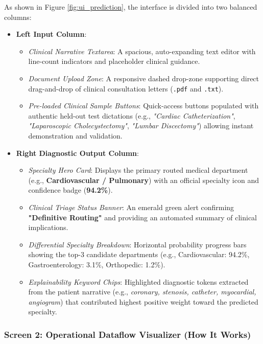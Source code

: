 As shown in Figure \ref{fig:ui_prediction}, the interface is divided into two balanced columns:
\begin{itemize}
    \item \textbf{Left Input Column}:
    \begin{itemize}
        \item \textit{Clinical Narrative Textarea}: A spacious, auto-expanding text editor with line-count indicators and placeholder clinical guidance.
        \item \textit{Document Upload Zone}: A responsive dashed drop-zone supporting direct drag-and-drop of clinical consultation letters (\texttt{.pdf} and \texttt{.txt}).
        \item \textit{Pre-loaded Clinical Sample Buttons}: Quick-access buttons populated with authentic held-out test dictations (e.g., \textit{"Cardiac Catheterization"}, \textit{"Laparoscopic Cholecystectomy"}, \textit{"Lumbar Discectomy"}) allowing instant demonstration and validation.
    \end{itemize}
    \item \textbf{Right Diagnostic Output Column}:
    \begin{itemize}
        \item \textit{Specialty Hero Card}: Displays the primary routed medical department (e.g., \textbf{Cardiovascular / Pulmonary}) with an official specialty icon and confidence badge (\textbf{94.2\%}).
        \item \textit{Clinical Triage Status Banner}: An emerald green alert confirming \textbf{"Definitive Routing"} and providing an automated summary of clinical implications.
        \item \textit{Differential Specialty Breakdown}: Horizontal probability progress bars showing the top-3 candidate departments (e.g., Cardiovascular: 94.2\%, Gastroenterology: 3.1\%, Orthopedic: 1.2\%).
        \item \textit{Explainability Keyword Chips}: Highlighted diagnostic tokens extracted from the patient narrative (e.g., \textit{coronary, stenosis, catheter, myocardial, angiogram}) that contributed highest positive weight toward the predicted specialty.
    \end{itemize}
\end{itemize}

\subsubsection{Screen 2: Operational Dataflow Visualizer (How It Works)}

